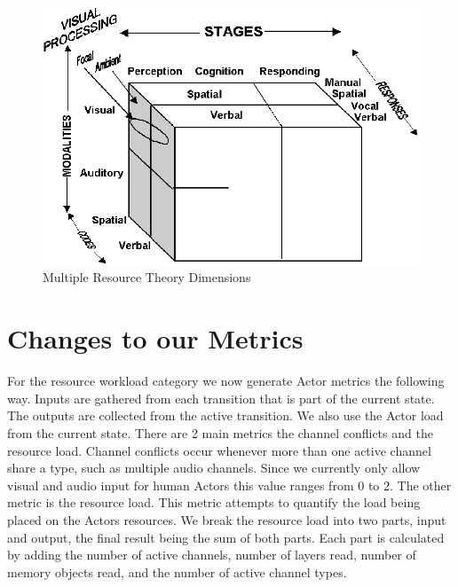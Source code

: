 \begin{figure}[h]
\begin{center}
\includegraphics[width=6in]{multresourcetheory.png}
\caption{Multiple Resource Theory Dimensions}
\label{fig:multipleresourcetheory}
\end{center}
\end{figure}

\section{Changes to our Metrics}
For the resource workload category we now generate Actor metrics the following way.  Inputs are gathered from each transition that is part of the current state.  The outputs are collected from the active transition.  We also use the Actor load from the current state.  There are 2 main metrics the channel conflicts and the resource load.  Channel conflicts occur whenever more than one active channel share a type, such as multiple audio channels.  Since we currently only allow visual and audio input for human Actors this value ranges from 0 to 2.  The other metric is the resource load.  This metric attempts to quantify the load being placed on the Actors resources.  We break the resource load into two parts, input and output, the final result being the sum of both parts.  Each part is calculated by adding the number of active channels, number of layers read, number of memory objects read, and the number of active channel types.

